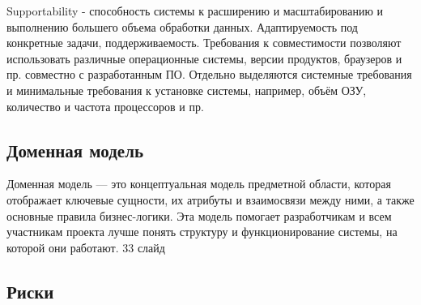 Supportability - способность системы к расширению и масштабированию и выполнению большего объема обработки данных. Адаптируемость под конкретные задачи, поддерживаемость.
Требования к совместимости позволяют использовать различные операционные системы, версии продуктов, браузеров и пр. совместно с разработанным ПО. Отдельно выделяются системные требования и минимальные требования к установке системы, например, объём
ОЗУ, количество и частота процессоров и пр.

\subsection[Доменная модель]{Доменная модель}
Доменная модель — это концептуальная модель предметной области, которая отображает ключевые сущности, их атрибуты и взаимосвязи между ними, а также основные правила бизнес-логики. Эта модель помогает разработчикам и всем участникам проекта лучше понять структуру и функционирование системы, на которой они работают.
33 слайд

\subsection{Риски}


